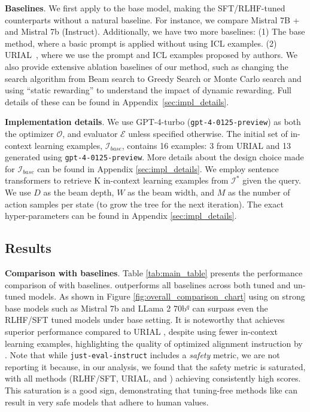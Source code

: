 \noindent \textbf{Baselines}. 
We first apply \ours to the base model, making the SFT/RLHF-tuned counterparts without \ours a natural baseline. For instance, we compare Mistral 7B + \ours and Mistral 7b (Instruct). Additionally, we have two more baselines: (1) The base method, where a basic prompt is applied without using ICL examples. (2) URIAL~\cite{Lin2024ReAlign}, where we use the prompt and ICL examples proposed by authors. We also provide extensive ablation baselines of our method, such as changing the search algorithm from Beam search to Greedy Search or Monte Carlo search and using ``static rewarding'' to understand the impact of dynamic rewarding. Full details of these can be found in Appendix~\ref{sec:impl_details}.




\noindent \textbf{Implementation details}.
We use GPT-4-turbo (\texttt{gpt-4-0125-preview}) as both the optimizer $\mathcal{O}$, and evaluator $\mathcal{E}$ unless specified otherwise. The initial set of in-context learning examples, $\mathcal{I}_{base}$, contains 16 examples: 3 from URIAL \cite{Lin2024ReAlign} and 13 generated using \texttt{gpt-4-0125-preview}. More details about the design choice made for $\mathcal{I}_{base}$ can be found in Appendix \ref{sec:impl_details}. We employ sentence transformers \cite{reimers-2019-sentence-bert} to retrieve K in-context learning examples from $\mathcal{I}^*$ given the query. We use $D$ as the beam depth, $W$ as the beam width, and $M$ as the number of action samples per state (to grow the tree for the next iteration). The exact hyper-parameters can be found in Appendix \ref{sec:impl_details}.


\subsection{Results}

\noindent \textbf{Comparison with baselines}. 
Table \ref{tab:main_table} presents the performance comparison of \ours with baselines. \ours outperforms all baselines across both tuned and un-tuned models. As shown in Figure \ref{fig:overall_comparison_chart} using \ours on strong base models such as Mistral 7b and LLama 2 70b$^q$ can surpass even the RLHF/SFT tuned models under base setting. It is noteworthy that \ours achieves superior performance compared to URIAL \citep{Lin2024ReAlign}, despite using fewer in-context learning examples, highlighting the quality of optimized alignment instruction by \ours. Note that while \texttt{just-eval-instruct} includes a \textit{safety} metric, we are not reporting it because, in our analysis, we found that the safety metric is saturated, with all methods (RLHF/SFT, URIAL, and \ours) achieving consistently high scores. This saturation is a good sign, demonstrating that tuning-free methods like \ours can result in very safe models that adhere to human values.



